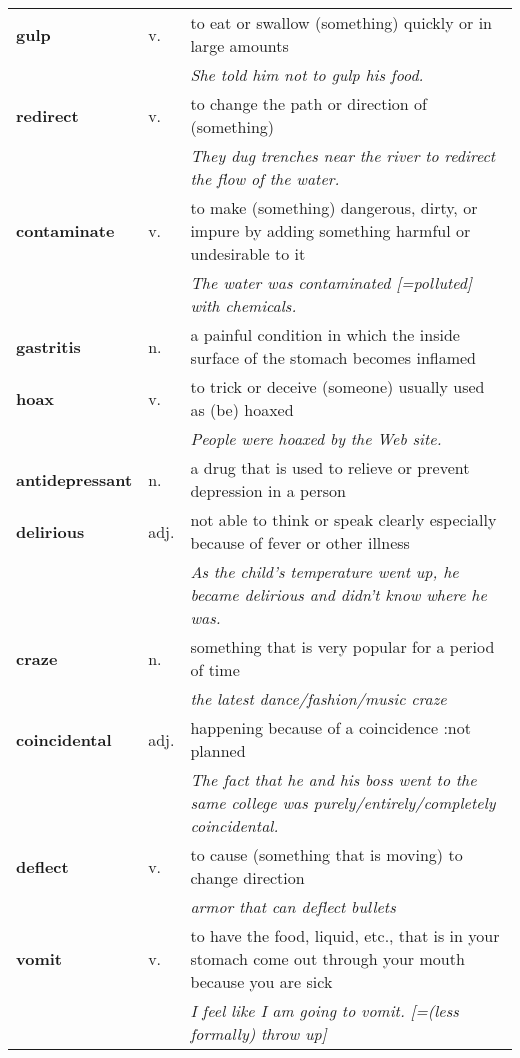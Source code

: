 \documentclass[a4paper]{article}
\begin{document}
\begin{longtable}{llp{11cm}}
\textbf{gulp} & v. &  to eat or swallow (something) quickly or in large amounts \\
 & & \textit{She told him not to gulp his food.}\\[0.08cm]
\textbf{redirect} & v. &  to change the path or direction of (something) \\
 & & \textit{They dug trenches near the river to redirect the flow of the water.}\\[0.08cm]
\textbf{contaminate} & v. &  to make (something) dangerous, dirty, or impure by adding something harmful or undesirable to it \\
 & & \textit{The water was contaminated [=polluted] with chemicals.}\\[0.08cm]
\textbf{gastritis} & n. &  a painful condition in which the inside surface of the stomach becomes inflamed\\[0.08cm]
\textbf{hoax} & v. &  to trick or deceive (someone) usually used as (be) hoaxed \\
 & & \textit{People were hoaxed by the Web site.}\\[0.08cm]
\textbf{antidepressant} & n. &  a drug that is used to relieve or prevent depression in a person\\[0.08cm]
\textbf{delirious} & adj. &  not able to think or speak clearly especially because of fever or other illness \\
 & & \textit{As the child's temperature went up, he became delirious and didn't know where he was.}\\[0.08cm]
\textbf{craze} & n. &  something that is very popular for a period of time \\
 & & \textit{the latest dance/fashion/music craze}\\[0.08cm]
\textbf{coincidental} & adj. &  happening because of a coincidence :not planned \\
 & & \textit{The fact that he and his boss went to the same college was purely/entirely/completely coincidental.}\\[0.08cm]
\textbf{deflect} & v. &  to cause (something that is moving) to change direction \\
 & & \textit{armor that can deflect bullets}\\[0.08cm]
\textbf{vomit} & v. &  to have the food, liquid, etc., that is in your stomach come out through your mouth because you are sick \\
 & & \textit{I feel like I am going to vomit. [=(less formally) throw up]}\\[0.08cm]

\end{longtable}
\end{document}
